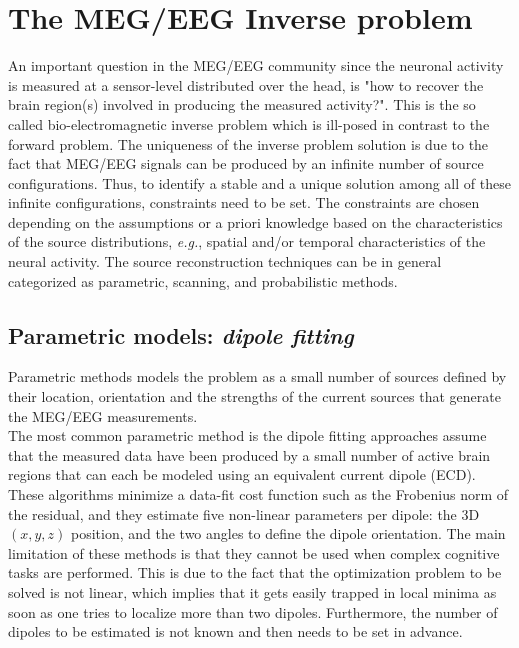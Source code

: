 
\section{The MEG/EEG Inverse problem}
An important question in the MEG/EEG community since the neuronal activity is measured at a sensor-level distributed over the head, is "how to recover the brain region(s) involved in producing the measured activity?". This is the so called bio-electromagnetic inverse problem which is ill-posed in contrast to the forward problem. The uniqueness of the inverse problem solution is due to the fact that MEG/EEG signals can be produced by an infinite number of source configurations. Thus, to identify a stable and a unique solution among all of these infinite configurations, constraints need to be set. The constraints are chosen depending on the assumptions or a priori knowledge based on the characteristics of the source distributions, \textit{e.g.}, spatial and/or temporal characteristics of the neural activity. The source reconstruction techniques can be in general categorized as parametric, scanning, and probabilistic methods.

\subsection{Parametric models: \textit{dipole fitting}} \label{section_dipfit}
Parametric methods models the problem as a small number of sources defined by their location, orientation and the strengths of the current sources that generate the MEG/EEG measurements.\\
The most common parametric method is the dipole fitting approaches \cite{scherg1985two,mosher1992multiple,scherg1990fundamentals} assume that the measured data have been produced by a small number of active brain regions that can each be modeled using an equivalent current dipole (ECD). These algorithms minimize a data-fit cost function such as the Frobenius norm of the residual, and they estimate five non-linear parameters per dipole: the 3D $(x,y,z)$ position, and the two angles to define the dipole orientation. The main limitation of these methods is that they cannot be used when complex cognitive tasks are performed. This is due to the fact that the optimization problem to be solved is not linear, which implies that it gets easily trapped in local minima as soon as one tries to localize more than two dipoles. Furthermore, the number of dipoles to be estimated is not known and then needs to be set in advance. 

